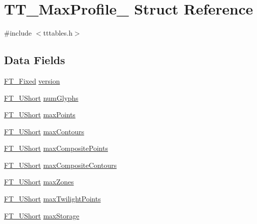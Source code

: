 \hypertarget{struct_t_t___max_profile__}{}\section{T\+T\+\_\+\+Max\+Profile\+\_\+ Struct Reference}
\label{struct_t_t___max_profile__}


{\ttfamily \#include $<$tttables.\+h$>$}

\subsection*{Data Fields}
\begin{DoxyCompactItemize}
\item 
\hyperlink{fttypes_8h_a5f5a679cc09f758efdd0d1c5feed3c3d}{F\+T\+\_\+\+Fixed} \hyperlink{struct_t_t___max_profile___a59618f7c572dadc58e883d32dea46380}{version}
\item 
\hyperlink{fttypes_8h_a937f6c17cf5ffd09086d8610c37b9f58}{F\+T\+\_\+\+U\+Short} \hyperlink{struct_t_t___max_profile___a6ec14b34978f24173d50ab556613ade5}{num\+Glyphs}
\item 
\hyperlink{fttypes_8h_a937f6c17cf5ffd09086d8610c37b9f58}{F\+T\+\_\+\+U\+Short} \hyperlink{struct_t_t___max_profile___a218fa149a195e9afa1738ef5aef07aa1}{max\+Points}
\item 
\hyperlink{fttypes_8h_a937f6c17cf5ffd09086d8610c37b9f58}{F\+T\+\_\+\+U\+Short} \hyperlink{struct_t_t___max_profile___a5af98bd8149008d0a33b61d9730262a9}{max\+Contours}
\item 
\hyperlink{fttypes_8h_a937f6c17cf5ffd09086d8610c37b9f58}{F\+T\+\_\+\+U\+Short} \hyperlink{struct_t_t___max_profile___aafc5ef3f58254792c353a6fb3b3a044e}{max\+Composite\+Points}
\item 
\hyperlink{fttypes_8h_a937f6c17cf5ffd09086d8610c37b9f58}{F\+T\+\_\+\+U\+Short} \hyperlink{struct_t_t___max_profile___a956e7c44e46a8aeb6d419b8550d1e556}{max\+Composite\+Contours}
\item 
\hyperlink{fttypes_8h_a937f6c17cf5ffd09086d8610c37b9f58}{F\+T\+\_\+\+U\+Short} \hyperlink{struct_t_t___max_profile___a07213312ec7b821a53a17d90930a478a}{max\+Zones}
\item 
\hyperlink{fttypes_8h_a937f6c17cf5ffd09086d8610c37b9f58}{F\+T\+\_\+\+U\+Short} \hyperlink{struct_t_t___max_profile___a907e28d69ad5e2a2c446e3eae8301af2}{max\+Twilight\+Points}
\item 
\hyperlink{fttypes_8h_a937f6c17cf5ffd09086d8610c37b9f58}{F\+T\+\_\+\+U\+Short} \hyperlink{struct_t_t___max_profile___a502a8579e3d358f3c00776ed0cc8a168}{max\+Storage}

\end{DoxyCompactItemize}
